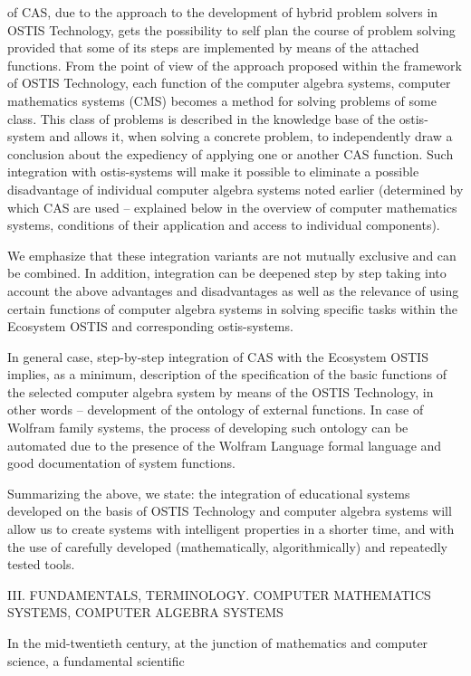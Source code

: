 \documentclass{article}
\begin{document}
\begin{multicols}{2}
\begin{itemize}
of CAS, due to the approach to the development
of hybrid problem solvers in OSTIS Technology,
gets the possibility to self plan the course of problem solving provided that some of its steps are
implemented by means of the attached functions.
From the point of view of the approach proposed
within the framework of OSTIS Technology, each
function of the computer algebra systems, computer
mathematics systems (CMS) becomes a method
for solving problems of some class. This class of
problems is described in the knowledge base of
the ostis-system and allows it, when solving a concrete problem, to independently draw a conclusion
about the expediency of applying one or another
CAS function. Such integration with ostis-systems
will make it possible to eliminate a possible disadvantage of individual computer algebra systems
noted earlier (determined by which CAS are used
– explained below in the overview of computer
mathematics systems, conditions of their application
and access to individual components).
\end{itemize} \par
We emphasize that these integration variants are not
mutually exclusive and can be combined. In addition,
integration can be deepened step by step taking into
account the above advantages and disadvantages as well
as the relevance of using certain functions of computer
algebra systems in solving specific tasks within the
Ecosystem OSTIS and corresponding ostis-systems.
\par In general case, step-by-step integration of CAS with
the Ecosystem OSTIS implies, as a minimum, description of the specification of the basic functions of the
selected computer algebra system by means of the
OSTIS Technology, in other words – development of
the ontology of external functions. In case of Wolfram
family systems, the process of developing such ontology
can be automated due to the presence of the Wolfram
Language formal language and good documentation of
system functions.
\par Summarizing the above, we state: the integration of
educational systems developed on the basis of OSTIS
Technology and computer algebra systems will allow
us to create systems with intelligent properties in a
shorter time, and with the use of carefully developed
(mathematically, algorithmically) and repeatedly tested
tools.
\begin{center}
    III. FUNDAMENTALS, TERMINOLOGY. COMPUTER
MATHEMATICS SYSTEMS, COMPUTER ALGEBRA
SYSTEMS
\end{center}
\par In the mid-twentieth century, at the junction of mathematics and computer science, a fundamental scientific

\end{multicols}
\end{document}
